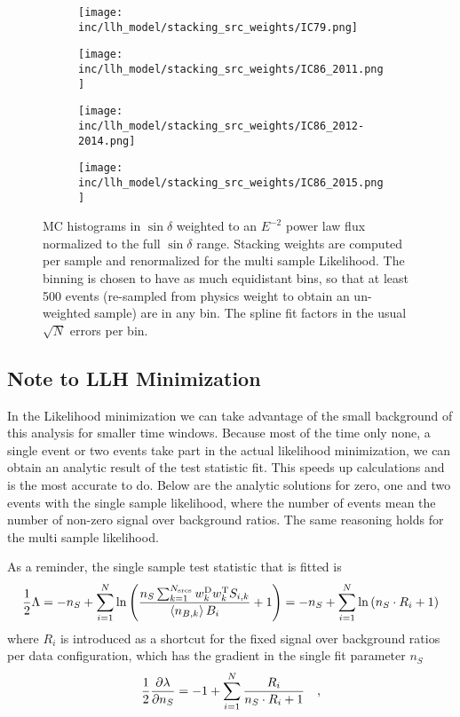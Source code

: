 \begin{figure}[htbp]
  \centering
  \begin{subfigure}[c]{0.49\textwidth}
    \texttt{[image: inc/llh\_model/stacking\_src\_weights/IC79.png]}
  \end{subfigure}
  \hfill
  \begin{subfigure}[c]{0.49\textwidth}
    \texttt{[image: inc/llh\_model/stacking\_src\_weights/IC86\_2011.png]}
  \end{subfigure}

  \begin{subfigure}[c]{0.49\textwidth}
    \texttt{[image: inc/llh\_model/stacking\_src\_weights/IC86\_2012-2014.png]}
  \end{subfigure}
  \hfill
  \begin{subfigure}[c]{0.49\textwidth}
    \texttt{[image: inc/llh\_model/stacking\_src\_weights/IC86\_2015.png]}
  \end{subfigure}

  \caption{MC histograms in $\sin\delta$ weighted to an $E^{-2}$ power law flux normalized to the full $\sin\delta$ range. Stacking weights are computed per sample and renormalized for the multi sample Likelihood. The binning is chosen to have as much equidistant bins, so that at least 500 events (re-sampled from physics weight to obtain an un-weighted sample) are in any bin. The spline fit factors in the usual $\sqrt N$ errors per bin.}
  \label{fig:stacking_src_weights_spl}
\end{figure}

\subsection{Note to LLH Minimization}
In the Likelihood minimization we can take advantage of the small background of this analysis for smaller time windows.
Because most of the time only none, a single event or two events take part in the actual likelihood minimization, we can obtain an analytic result of the test statistic fit.
This speeds up calculations and is the most accurate to do.
Below are the analytic solutions for zero, one and two events with the single sample likelihood, where the number of events mean the number of non-zero signal over background ratios.
The same reasoning holds for the multi sample likelihood.

As a reminder, the single sample test statistic that is fitted is
\begin{equation}
  \frac{1}{2}\Lambda
  = -n_S + \sum_{i=1}^N \ln\left(
      \frac{n_S\sum_{k=1}^{N_\text{srcs}}
            w_k^\text{D}w_k^\text{T}S_{i,k}}
           {\Braket{n_{B,k}} B_i} + 1\right)
  = -n_S + \sum_{i=1}^N \ln\left(n_S \cdot R_i + 1\right)
\end{equation}
where $R_i$ is introduced as a shortcut for the fixed signal over background ratios per data configuration, which has the gradient in the single fit parameter $n_S$
\begin{equation}
  \frac{1}{2}\frac{\partial \lambda}{\partial n_S}
  = -1 + \sum_{i=1}^N \frac{R_i}{n_S\cdot R_i + 1} \quad\text{,}
\end{equation}

